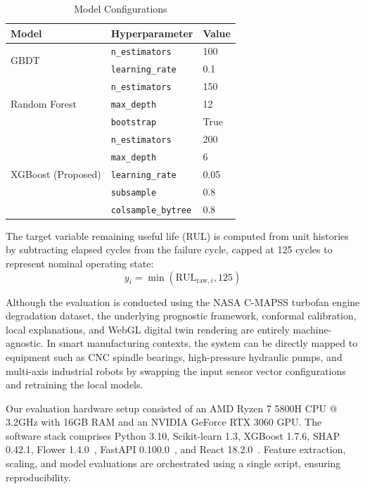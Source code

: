 \documentclass[letterpaper, 10 pt, conference]{ieeeconf}
\begin{document}
\begin{table}[htbp]
\caption{Model Configurations}
\label{tab:hyperparams}
\centering\small
\begin{tabular}{lll}
\toprule
\textbf{Model} & \textbf{Hyperparameter} & \textbf{Value} \\
\midrule
\multirow{2}{*}{GBDT} & \texttt{n\_estimators} & 100 \\
                      & \texttt{learning\_rate} & 0.1 \\
\midrule
\multirow{3}{*}{Random Forest} & \texttt{n\_estimators} & 150 \\
                               & \texttt{max\_depth} & 12 \\
                               & \texttt{bootstrap} & True \\
\midrule
\multirow{5}{*}{XGBoost (Proposed)} & \texttt{n\_estimators} & 200 \\
                                    & \texttt{max\_depth} & 6 \\
                                    & \texttt{learning\_rate} & 0.05 \\
                                    & \texttt{subsample} & 0.8 \\
                                    & \texttt{colsample\_bytree} & 0.8 \\
\bottomrule
\end{tabular}
\end{table}

The target variable remaining useful life (RUL) is computed from unit histories by subtracting elapsed cycles from the failure cycle, capped at 125 cycles to represent nominal operating state:
\begin{equation}
  y_i = \min\left(\text{RUL}_{\text{raw},i}, 125\right)
\end{equation}

Although the evaluation is conducted using the NASA C-MAPSS turbofan engine degradation dataset, the underlying prognostic framework, conformal calibration, local explanations, and WebGL digital twin rendering are entirely machine-agnostic. In smart manufacturing contexts, the system can be directly mapped to equipment such as CNC spindle bearings, high-pressure hydraulic pumps, and multi-axis industrial robots by swapping the input sensor vector configurations and retraining the local models.

Our evaluation hardware setup consisted of an AMD Ryzen 7 5800H CPU @ 3.2GHz with 16GB RAM and an NVIDIA GeForce RTX 3060 GPU. The software stack comprises Python 3.10, Scikit-learn 1.3, XGBoost 1.7.6, SHAP 0.42.1, Flower 1.4.0~\cite{flower}, FastAPI 0.100.0~\cite{fastapi}, and React 18.2.0~\cite{react}. Feature extraction, scaling, and model evaluations are orchestrated using a single script, ensuring reproducibility.
\end{document}
